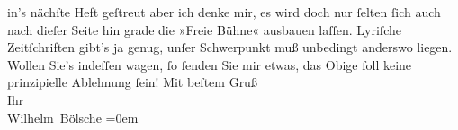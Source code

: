 \begin{ledgroupsized}[t]{13cm}
                    in’s nächſte Heft geſtreut {\pb}aber ich denke mir, es
                    wird doch nur ſelten ſich auch nach dieſer Seite hin grade die »Freie Bühne« ausbauen laſſen. Lyriſche Zeitſchriften gibt’s
                    ja genug, unſer Schwerpunkt muß unbedingt anderswo liegen. Wollen Sie’s indeſſen
                    wagen, ſo ſenden Sie mir etwas, das Obige ſoll keine prinzipielle Ablehnung
                    ſein!\pend
           \pstart
           Mit beſtem Gruß{\\[\baselineskip]}Ihr{\\[\baselineskip]}\spacefill\mbox{Wilhelm Bölsche}\pend
           \leftskip=0em{}          \endnumbering{}\end{ledgroupsized}  \newcommand{\dateiname}{L00087}\newcommand{\titel}{Wilhelm Bölsche an Arthur Schnitzler, 24. 3. 1892}\newcommand{\editorInnen}{Martin Anton Müller und Gerd-Hermann Susen}
            \footnotesize
\begin{ledgroupsized}[t]{11.5cm}
\end{ledgroupsized}
         
      
